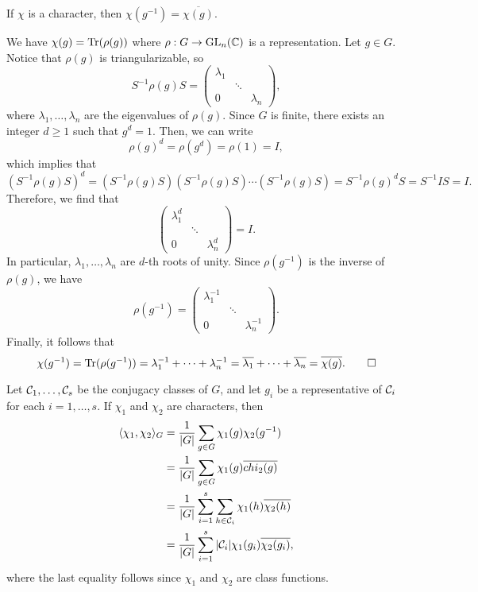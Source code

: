\begin{remark}{}
    If $\chi$ is a character, then $\chi(g^{-1}) = \overline{\chi(g)}$. 
\end{remark}
\begin{pf}
    We have $\chi(g) = \operatorname{Tr}(\rho(g))$ where $\rho : G \to \operatorname{GL}_n(\mathbb{C})$ is a 
    representation. Let $g \in G$. Notice that $\rho(g)$ is triangularizable, 
    so 
    \[ S^{-1}\rho(g)S = \begin{pmatrix}
        \lambda_1 & &   \\ & \ddots & \\ 0 & & \lambda_n 
    \end{pmatrix}, \] 
    where $\lambda_1, \dots, \lambda_n$ are the eigenvalues of $\rho(g)$. 
    Since $G$ is finite, there exists an integer $d \geq 1$ such that $g^d = 1$. 
    Then, we can write 
    \[ \rho(g)^d = \rho(g^d) = \rho(1) = I, \] 
    which implies that 
    \[ (S^{-1}\rho(g)S)^d = (S^{-1}\rho(g)S)(S^{-1}\rho(g)S)\cdots 
    (S^{-1}\rho(g)S) = S^{-1}\rho(g)^d S = S^{-1}IS = I. \] 
    Therefore, we find that 
    \[ \begin{pmatrix}
        \lambda_1^d & &   \\ & \ddots & \\ 0 & & \lambda_n^d 
    \end{pmatrix} = I. \] 
    In particular, $\lambda_1, \dots, \lambda_n$ are $d$-th roots of unity. 
    Since $\rho(g^{-1})$ is the inverse of $\rho(g)$, we have 
    \[ \rho(g^{-1}) = \begin{pmatrix}
        \lambda_1^{-1} & &   \\ & \ddots & \\ 0 & & \lambda_n^{-1} 
    \end{pmatrix}. \] 
    Finally, it follows that 
    \[ \chi(g^{-1}) = \operatorname{Tr}(\rho(g^{-1})) = \lambda_1^{-1} + \cdots + \lambda_n^{-1}
    = \overline{\lambda_1} + \cdots + \overline{\lambda_n} = \overline{\chi(g)}. 
    \qedhere \] 
\end{pf}

Let ${\cal C}_1, \dots, {\cal C}_s$ be the conjugacy classes of $G$, and let 
$g_i$ be a representative of ${\cal C}_i$ for each $i = 1, \dots, s$. 
If $\chi_1$ and $\chi_2$ are characters, then 
\begin{align*}
    \langle \chi_1, \chi_2 \rangle_G 
    &= \frac1{|G|} \sum_{g\in G} \chi_1(g) \chi_2(g^{-1}) \\ 
    &= \frac1{|G|} \sum_{g\in G} \chi_1(g) \overline{chi_2(g)} \\ 
    &= \frac1{|G|} \sum_{i=1}^s \sum_{h\in{\cal C}_i} \chi_1(h) \overline{\chi_2(h)} \\
    &= \frac1{|G|} \sum_{i=1}^s |{\cal C}_i| \chi_1(g_i) \overline{\chi_2(g_i)},
\end{align*}
where the last equality follows since $\chi_1$ and $\chi_2$ are class functions. 

